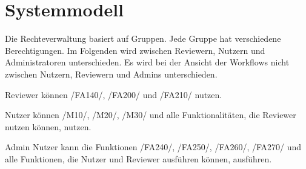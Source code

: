 \chapter{Systemmodell}
Die Rechteverwaltung basiert auf Gruppen. Jede Gruppe hat verschiedene Berechtigungen. Im Folgenden wird zwischen Reviewern, Nutzern und Administratoren unterschieden. 
Es wird bei der Ansicht der Workflows nicht zwischen Nutzern, Reviewern und Admins unterschieden. 

Reviewer können /FA140/, /FA200/ und /FA210/ nutzen.

Nutzer können /M10/, /M20/, /M30/ und alle Funktionalitäten, die Reviewer nutzen können, nutzen.

Admin Nutzer kann die Funktionen /FA240/, /FA250/, /FA260/, /FA270/ und alle Funktionen, die Nutzer und Reviewer ausführen können, ausführen.